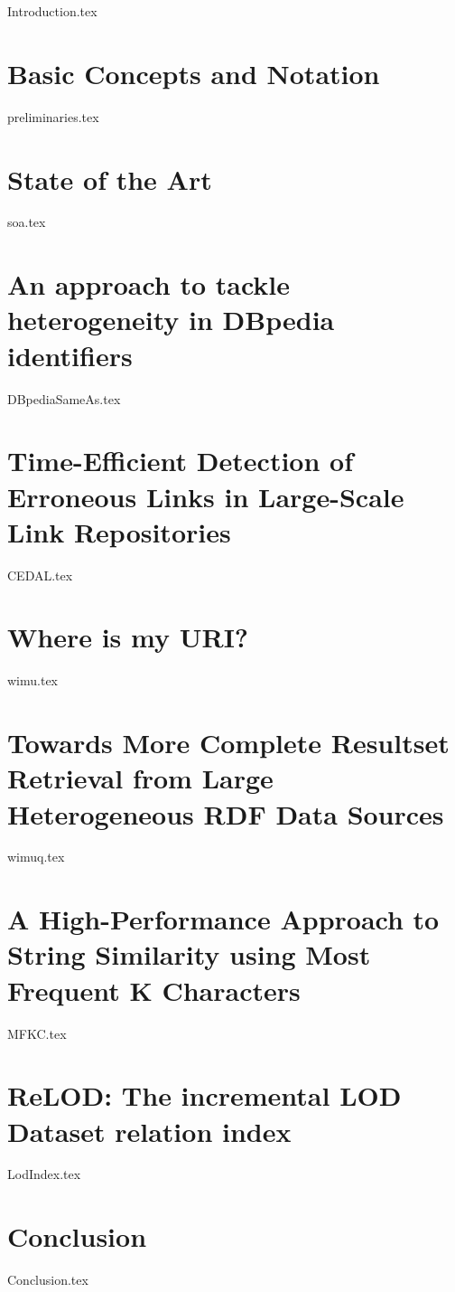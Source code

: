 \documentclass[a4paper,twoside,abstracton,12pt,BCOR=15mm]{scrreprt}
\begin{document}
{Introduction.tex}

\chapter{Basic Concepts and Notation} \label{ch:preliminaries}
{preliminaries.tex}

\chapter{State of the Art} \label{ch:soa}
{soa.tex}

\chapter{An approach to tackle heterogeneity in DBpedia identifiers} \label{ch:dbpediaSameAs}
{DBpediaSameAs.tex}

\chapter{Time-Efficient Detection of Erroneous Links in Large-Scale Link Repositories} \label{ch:CEDAL}
{CEDAL.tex}

\chapter{Where is my URI?} \label{ch:wimu}
{wimu.tex}

\chapter{Towards More Complete Resultset Retrieval from Large Heterogeneous RDF Data Sources} \label{ch:wimuq}
{wimuq.tex}

\chapter{A High-Performance Approach to String Similarity using Most Frequent K Characters} \label{ch:MFKC}
{MFKC.tex}

\chapter{ReLOD: The incremental LOD Dataset relation index} \label{ch:lodIndex}
{LodIndex.tex}

\chapter{Conclusion} \label{ch:conclusion}
{Conclusion.tex}
\end{document}
